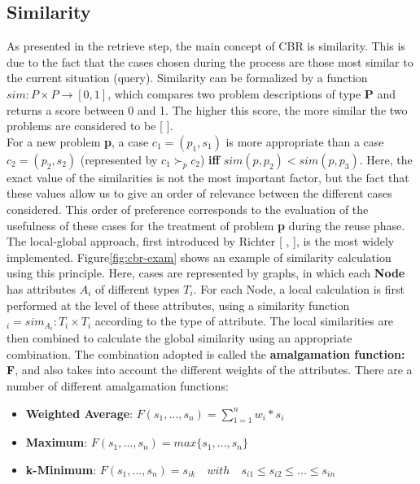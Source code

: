     \subsection{Similarity\label{subsec:similarity}}
    As presented in the retrieve step, the main concept of CBR is similarity. This is due to the fact that the cases chosen during the process are those most similar to the current situation (query). Similarity can be formalized by a function $sim: P \times P \rightarrow [0, 1]$, which compares two problem descriptions of type \textbf{P} and returns a score between 0 and 1. The higher this score, the more similar the two problems are considered to be [ ].\\
    For a new problem \textbf{p}, a case $c_1 = (p_1, s_1)$ is more appropriate than a case $c_2 = (p_2, s_2)$ (represented by $c_1 \succ_p c_2$) \textbf{iff} $sim(p, p_2) < sim(p, p_3)$. Here, the exact value of the similarities is not the most important factor, but the fact that these values allow us to give an order of relevance between the different cases considered. This order of preference corresponds to the evaluation of the usefulness of these cases for the treatment of problem \textbf{p} during the reuse phase.\\
    
    The local-global approach, first introduced by Richter [ , ], is the most widely implemented. Figure\ref{fig:cbr-exam} shows an example of similarity calculation using this principle. Here, cases are represented by graphs, in which each \textbf{Node} has attributes $A_i$ of different types $T_i$. For each Node, a local calculation is first performed at the level of these attributes, using a similarity function $_i = sim_{A_i} : T_i \times T_i$ according to the type of attribute. The local similarities are then combined to calculate the global similarity using an appropriate combination. The combination adopted is called the \textbf{amalgamation function: F}, and also takes into account the different weights of the attributes. There are a number of different amalgamation functions:
    \begin{itemize}
        \item \textbf{Weighted Average}: $F(s_1,...,s_n)= \sum_{1=1}^{n} w_i*s_i$
        \item \textbf{Maximum}: $F(s_1,...,s_n) = max\{s_1,...,s_n\}$
        \item \textbf{k-Minimum}: $F(s_1,...,s_n) = s_{ik} \quad with \quad s_{i1} \leq s_{i2} \leq ... \leq s_{in}$
    \end{itemize}
    
